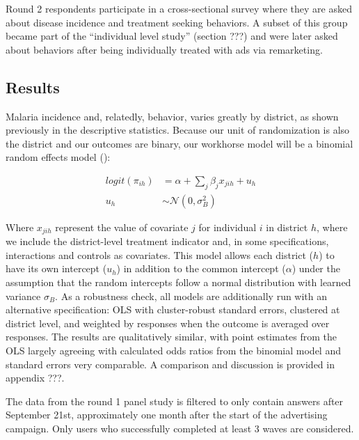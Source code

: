 \documentclass[a4paper,12pt]{article}
\theoremstyle{proposition}
\begin{document}
Round 2 respondents participate in a cross-sectional survey where they are asked about disease incidence and treatment seeking behaviors. A subset of this group became part of the ``individual level study'' (section ???) and were later asked about behaviors after being individually treated with ads via remarketing.






\subsection{Results}

Malaria incidence and, relatedly, behavior, varies greatly by district, as shown previously in the descriptive statistics. Because our unit of randomization is also the district and our outcomes are binary, our workhorse model will be a binomial random effects model (\cite{Hayes2017}):

\begin{align*}
logit(\pi_{ih}) &= \alpha + \sum_j \beta_j x_{jih} + u_h \\
u_h &\sim \mathcal{N}(0, \sigma_B^2)
\end{align*}

Where $x_{jih}$ represent the value of covariate $j$ for individual $i$ in district $h$, where we include the district-level treatment indicator and, in some specifications, interactions and controls as covariates. This model allows each district ($h$) to have its own intercept ($u_h$) in addition to the common intercept ($\alpha$) under the assumption that the random intercepts follow a normal distribution with learned variance $\sigma_B$. As a robustness check, all models are additionally run with an alternative specification: OLS with cluster-robust standard errors, clustered at district level, and weighted by responses when the outcome is averaged over responses. The results are qualitatively similar, with point estimates from the OLS largely agreeing with calculated odds ratios from the binomial model and standard errors very comparable. A comparison and discussion is provided in appendix ???.

The data from the round 1 panel study is filtered to only contain answers after September 21st, approximately one month after the start of the advertising campaign. Only users who successfully completed at least 3 waves are considered.
\end{document}

